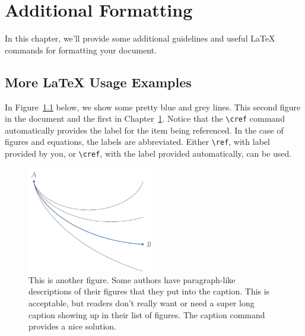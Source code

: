\chapter{Additional \rmfamily{\LaTeX{}} Formatting}
\label{ch:ch2}

In this chapter, we'll provide some additional guidelines and useful \LaTeX{} commands for formatting your document.


\section{More {\rmfamily\LaTeX{}} Usage Examples}
In Figure~\ref{fig:brach} below, we show some pretty blue and grey lines. This second figure in the document and the first in Chapter~\ref{ch:ch2}. Notice that the \verb|\cref| command automatically provides the label for the item being referenced. In the case of figures and equations, the labels are abbreviated. Either \verb|\ref|, with label provided by you, or \verb|\cref|, with the label provided automatically, can be used. 

\begin{figure}[htbp]
	\centering
	\includegraphics[width=2.2in]{figures/brachistochrone}
	\caption[Short caption to appear in list of figures.]{This is another figure. Some authors have paragraph-like descriptions of their figures that they put into the caption. This is acceptable, but readers don't really want or need a super long caption showing up in their list of figures. The {\ttfamily caption} command provides a nice solution.}
	\label{fig:brach}
\end{figure}

